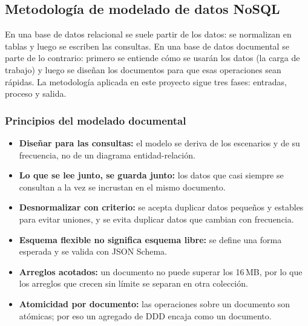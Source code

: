 \documentclass[11pt,a4paper]{article}
\begin{document}
	\subsection{Metodología de modelado de datos NoSQL}
	En una base de datos relacional se suele partir de los datos: se normalizan en tablas y luego se escriben las consultas. En una base de datos documental se parte de lo contrario: primero se entiende cómo se usarán los datos (la carga de trabajo) y luego se diseñan los documentos para que esas operaciones sean rápidas. La metodología aplicada en este proyecto sigue tres fases: entradas, proceso y salida.
	
	\subsubsection{Principios del modelado documental}
	\begin{itemize}[leftmargin=2em]
		\item \textbf{Diseñar para las consultas:} el modelo se deriva de los escenarios y de su frecuencia, no de un diagrama entidad-relación.
		\item \textbf{Lo que se lee junto, se guarda junto:} los datos que casi siempre se consultan a la vez se incrustan en el mismo documento.
		\item \textbf{Desnormalizar con criterio:} se acepta duplicar datos pequeños y estables para evitar uniones, y se evita duplicar datos que cambian con frecuencia.
		\item \textbf{Esquema flexible no significa esquema libre:} se define una forma esperada y se valida con JSON Schema.
		\item \textbf{Arreglos acotados:} un documento no puede superar los 16\,MB, por lo que los arreglos que crecen sin límite se separan en otra colección.
		\item \textbf{Atomicidad por documento:} las operaciones sobre un documento son atómicas; por eso un agregado de DDD encaja como un documento.
	\end{itemize}
	
\end{document}
